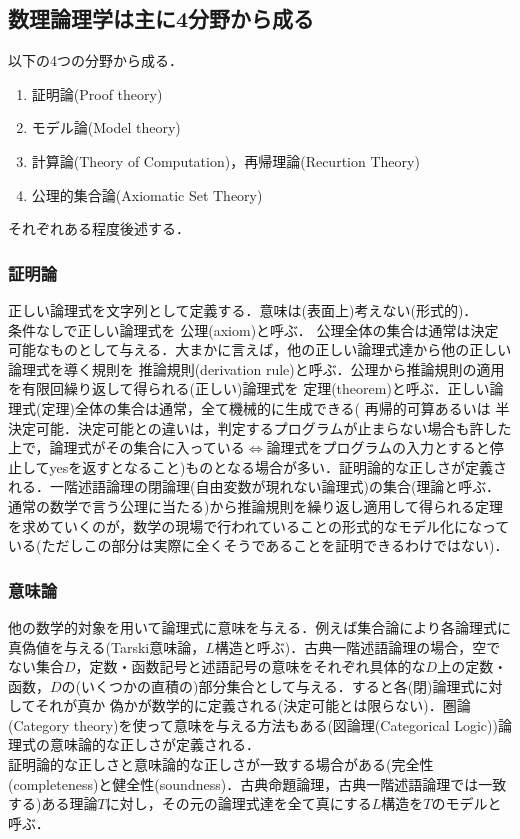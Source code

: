 \documentclass{ltjsarticle}
\theoremstyle{mystyle1}
\theoremstyle{mystyle3}
\theoremstyle{mystyle2}
\newcommand{\red}[1]{{\color{red} #1}}
\begin{document}
\subsection{数理論理学は主に4分野から成る}
以下の4つの分野から成る．
\begin{enumerate}
  \item 証明論(Proof theory)
  \item モデル論(Model theory)
  \item 計算論(Theory of Computation)，再帰理論(Recurtion Theory)
  \item 公理的集合論(Axiomatic Set Theory)
\end{enumerate}
それぞれある程度後述する．
\subsubsection{証明論}
正しい論理式を文字列として定義する．意味は(表面上)考えない(形式的)．\\
条件なしで正しい論理式を\red{公理}(axiom)と呼ぶ． 公理全体の集合は通常は決定可能なものとして与える．大まかに言えば，他の正しい論理式達から他の正しい論理式を導く規則を\red{推論規則}(derivation rule)と呼ぶ．公理から推論規則の適用を有限回繰り返して得られる(正しい)論理式を\red{定理}(theorem)と呼ぶ．正しい論理式(定理)全体の集合は通常，全て機械的に生成できる(\red{再帰的可算}あるいは\red{半決定可能}．決定可能との違いは，判定するプログラムが止まらない場合も許した上で，論理式がその集合に入っている$\Leftrightarrow$論理式をプログラムの入力とすると停止してyesを返すとなること)ものとなる場合が多い．証明論的な正しさが定義される．一階述語論理の閉論理(自由変数が現れない論理式)の集合(理論と呼ぶ．通常の数学で言う公理に当たる)から推論規則を繰り返し適用して得られる定理を求めていくのが，数学の現場で行われていることの形式的なモデル化になっている(ただしこの部分は実際に全くそうであることを証明できるわけではない)．
\subsubsection{意味論}
他の数学的対象を用いて論理式に意味を与える．例えば集合論により各論理式に真偽値を与える(Tarski意味論，$L$構造と呼ぶ)．古典一階述語論理の場合，空でない集合$D$，定数・函数記号と述語記号の意味をそれぞれ具体的な$D$上の定数・函数，$D$の(いくつかの直積の)部分集合として与える．すると各(閉)論理式に対してそれが真か 偽かが数学的に定義される(決定可能とは限らない)．圏論(Category theory)を使って意味を与える方法もある(図論理(Categorical Logic))論理式の意味論的な正しさが定義される．\\
証明論的な正しさと意味論的な正しさが一致する場合がある(完全性(completeness)と健全性(soundness)．古典命題論理，古典一階述語論理では一致する)ある理論$T$に対し，その元の論理式達を全て真にする$L$構造を$T$のモデルと呼ぶ．
\end{document}

